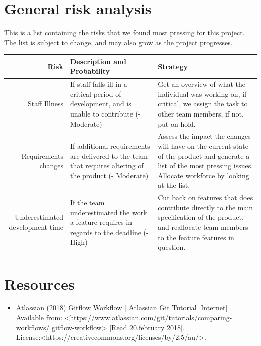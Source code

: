 \documentclass[12pt]{article}%
\begin{document}
\section{General risk analysis}
This is a list containing the risks that we found most pressing for this project. The list is subject to change, and may also grow as the project progresses.
\vspace{5mm}


\begin{tabularx}{\linewidth}{ r X X }
\hline
Risk & Description and Probability & Strategy \\ \hline

Staff Illness 
& If staff falls ill in a critical period of development, and is unable to contribute (- Moderate)
& Get an overview of what the individual was working on, if critical, we assign the task to other team members, if not, put on hold.\\

Requirements changes        
&If additional requirements are delivered to the team that requires altering of the product (- Moderate)
& Assess the impact the changes will have on the current state of the product and generate a list of the most pressing issues. Allocate workforce by looking at the list.\\ \hline
Underestimated development time
&If the team underestimated the work a feature requires in regards to the deadline (- High)                         
& Cut back on features that does contribute directly to the main specification of the product, and reallocate team members to the feature features in question.                 \\ \hline
\end{tabularx}

\section{Resources}
\begin{itemize}
\item Atlassian (2018) Gitflow Workflow | Atlassian Git Tutorial [Internet] \\
	  Available from: \textless https://www.atlassian.com/git/tutorials/comparing-workflows/
	  gitflow-workflow\textgreater
	  [Read 20.february 2018].\\
	  License:\textless https://creativecommons.org/licenses/by/2.5/au/\textgreater .
\end{itemize}
\end{document}
